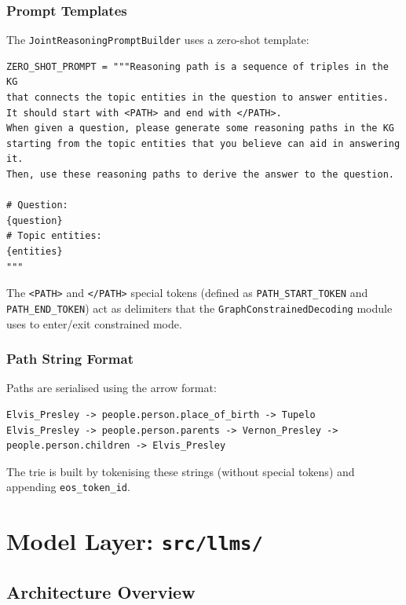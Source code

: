 \documentclass[11pt,a4paper,oneside,openany]{book}
\theoremstyle{definition}
\newcommand{\code}[1]{\texttt{#1}}
\begin{document}
\subsection{Prompt Templates}

The \code{JointReasoningPromptBuilder} uses a zero-shot template:

\begin{lstlisting}[numbers=none]
ZERO_SHOT_PROMPT = """Reasoning path is a sequence of triples in the KG
that connects the topic entities in the question to answer entities.
It should start with <PATH> and end with </PATH>.
When given a question, please generate some reasoning paths in the KG
starting from the topic entities that you believe can aid in answering it.
Then, use these reasoning paths to derive the answer to the question.

# Question:
{question}
# Topic entities:
{entities}
"""
\end{lstlisting}

The \code{<PATH>} and \code{</PATH>} special tokens (defined as \code{PATH\_START\_TOKEN} and \code{PATH\_END\_TOKEN}) act as delimiters that the \code{GraphConstrainedDecoding} module uses to enter/exit constrained mode.

\subsection{Path String Format}

Paths are serialised using the arrow format:
\begin{lstlisting}[numbers=none]
Elvis_Presley -> people.person.place_of_birth -> Tupelo
Elvis_Presley -> people.person.parents -> Vernon_Presley -> people.person.children -> Elvis_Presley
\end{lstlisting}

The trie is built by tokenising these strings (without special tokens) and appending \code{eos\_token\_id}.

\chapter{Model Layer: \texttt{src/llms/}}\label{ch:llms}

\section{Architecture Overview}
\end{document}
